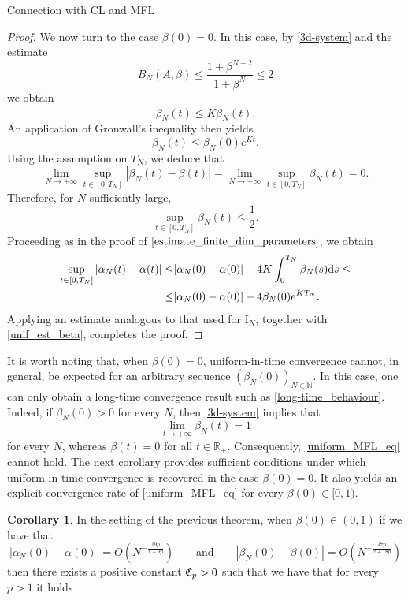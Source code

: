 \documentclass{article}
\theoremstyle{definition}
\newtheorem{corollary}[definition]{Corollary}
\newcommand{\N}{\mathbb{N}}
\renewcommand{\d}{\textnormal{d}}
\begin{document}
\begin{section}{Connection with CL and MFL}
\begin{proof}
    We now turn to the case $\beta(0)=0$. In this case, by \eqref{3d-system} and the estimate
    $$B_N(A,\beta)\leq\frac{1+\beta^{N-2}}{1+\beta^N}\leq2$$
    we obtain
    $$\dot{\beta}_N(t)\leq K\beta_N(t).$$
    An application of Gronwall's inequality then yields
    $$\beta_N(t)\leq\beta_N(0)e^{Kt}.$$
    Using the assumption on $T_N$, we deduce that
    $$\lim_{N\rightarrow+\infty}\sup_{t\in[0,T_N]}|\beta_N(t)-\beta(t)|=\lim_{N\rightarrow+\infty}\sup_{t\in[0,T_N]}\beta_N(t)=0.$$
    Therefore, for $N$ sufficiently large,
    \begin{equation}\label{unif_est_beta}
        \sup_{t\in[0,T_N]}\beta_N(t)\leq\frac{1}{2}.
    \end{equation}
    Proceeding as in the proof of $\ref{estimate_finite_dim_parameters}$, we obtain
    \begin{align*}
        \sup_{t\in[0,T_N]}|\alpha_N(t)-\alpha(t)|\leq&|\alpha_N(0)-\alpha(0)|+4K\int_0^{T_N}\beta_N(s)\d s\leq\\
        \leq&|\alpha_N(0)-\alpha(0)|+4\beta_N(0)e^{KT_N}.
    \end{align*}
    Applying an estimate analogous to that used for $\mathrm{I}_N$, together with \eqref{unif_est_beta}, completes the proof.
\end{proof}
It is worth noting that, when $\beta(0)=0$, uniform-in-time convergence cannot, in general, be expected for an arbitrary sequence $\left(\beta_N(0)\right)_{N\in\N}.$ In this case, one can only obtain a long-time convergence result such as \eqref{long-time_behaviour}. Indeed, if $\beta_N(0)>0$ for every $N$, then \eqref{3d-system} implies that $$ \lim_{t\to+\infty}\beta_N(t)=1 $$ for every $N$, whereas $\beta(t)=0$ for all $t\in\mathbb{R}_+$. Consequently, \eqref{uniform_MFL_eq} cannot hold. The next corollary provides sufficient conditions under which uniform-in-time convergence is recovered in the case $\beta(0)=0$. It also yields an explicit convergence rate of \eqref{uniform_MFL_eq} for every $\beta(0)\in[0,1)$.
\begin{corollary}
In the setting of the previous theorem, when $\beta(0)\in(0,1)$ if we have that
\begin{equation}\label{O_parameters}
    |\alpha_N(0)-\alpha(0)|=O\left(N^{-\frac{19p}{1+9p}}\right)\qquad\text{and}\qquad|\beta_N(0)-\beta(0)|=O\left(N^{-\frac{47p}{2+18p}}\right)
\end{equation}
then there exists a positive constant $\frak{C}_p>0$ such that  we have that for every $p>1$ it holds
\begin{equation}\label{W_p_rate}

\end{equation}
\end{corollary}
\end{section}
\end{document}
